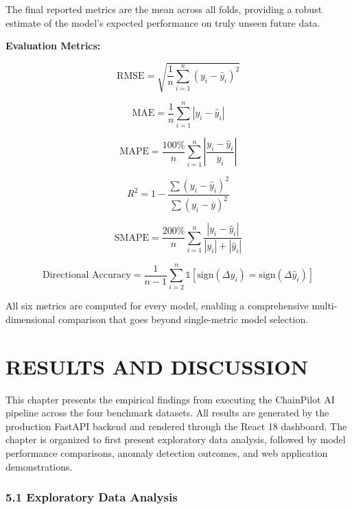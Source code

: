 \documentclass[12pt, a4paper]{report}
\begin{document}
The final reported metrics are the mean across all folds, providing a robust estimate of the model's expected performance on truly unseen future data.

\textbf{Evaluation Metrics:}

\begin{equation}
\text{RMSE} = \sqrt{\frac{1}{n}\sum_{i=1}^{n}(y_i - \hat{y}_i)^2}
\end{equation}

\begin{equation}
\text{MAE} = \frac{1}{n}\sum_{i=1}^{n}|y_i - \hat{y}_i|
\end{equation}

\begin{equation}
\text{MAPE} = \frac{100\%}{n}\sum_{i=1}^{n}\left|\frac{y_i - \hat{y}_i}{y_i}\right|
\end{equation}

\begin{equation}
R^2 = 1 - \frac{\sum(y_i - \hat{y}_i)^2}{\sum(y_i - \bar{y})^2}
\end{equation}

\begin{equation}
\text{SMAPE} = \frac{200\%}{n}\sum_{i=1}^{n}\frac{|y_i - \hat{y}_i|}{|y_i| + |\hat{y}_i|}
\end{equation}

\begin{equation}
\text{Directional Accuracy} = \frac{1}{n-1}\sum_{i=2}^{n}\mathbb{1}[\text{sign}(\Delta y_i) = \text{sign}(\Delta \hat{y}_i)]
\end{equation}

All six metrics are computed for every model, enabling a comprehensive multi-dimensional comparison that goes beyond single-metric model selection.


\clearpage

\chapter{RESULTS AND DISCUSSION}

This chapter presents the empirical findings from executing the ChainPilot AI pipeline across the four benchmark datasets. All results are generated by the production FastAPI backend and rendered through the React 18 dashboard. The chapter is organized to first present exploratory data analysis, followed by model performance comparisons, anomaly detection outcomes, and web application demonstrations.

\subsection{5.1 Exploratory Data Analysis}
\end{document}
